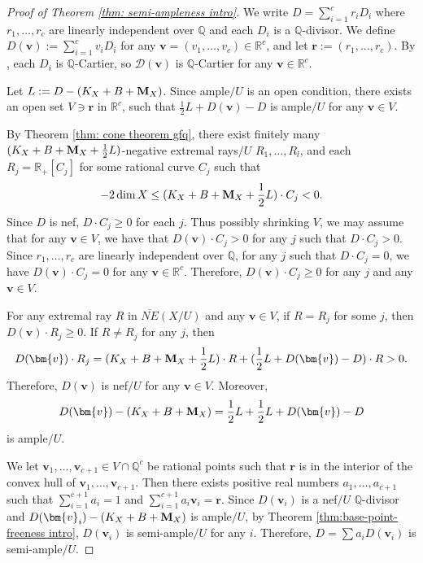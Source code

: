 \documentclass[11pt]{amsart}
\numberwithin{equation}{section}
\newcommand{\Mm}{{\bf{M}}}
\newcommand{\Qq}{\mathbb{Q}}
\theoremstyle{definition}
\theoremstyle{definition}
\theoremstyle{definition}
\begin{document}
\begin{proof}[Proof of Theorem \ref{thm: semi-ampleness intro}]
We write $D=\sum_{i=1}^c r_iD_i$ where $r_1,\dots,r_c$ are linearly independent over $\mathbb Q$ and each $D_i$ is a $\Qq$-divisor. We define $D(\bm{v}):=\sum_{i=1}^cv_iD_i$ for any $\bm{v}=(v_1,\dots,v_c)\in\mathbb R^c$, and let $\bm{r}:=(r_1,\dots,r_c)$. By \cite[Lemma 5.3]{HLS19}, each $D_i$ is $\Qq$-Cartier, so $\mathcal{D}(\bm{v})$ is $\Qq$-Cartier for any $\bm{v}\in\mathbb R^c$. 

Let $L:=D-(K_X+B+\Mm_X)$. Since ample$/U$ is an open condition, there exists an open set $V\ni\bm{r}$ in $\mathbb R^c$, such that 
$\frac{1}{2}L+D(\bm{v})-D$ is ample$/U$ for any $\bm{v}\in V$.

By Theorem \ref{thm: cone theorem gfq}, there exist finitely many $(K_X+B+\Mm_X+\frac{1}{2}L)$-negative extremal rays$/U$ $R_1,\dots,R_l$, and each $R_j=\mathbb R_+[C_j]$ for some rational curve $C_j$ such that
$$-2\dim X\leq (K_X+B+\Mm_X+\frac{1}{2}L)\cdot C_j<0.$$
Since $D$ is nef, $D\cdot C_j\geq 0$ for each $j$. Thus possibly shrinking $V$, we may assume that for any $\bm{v}\in V$, we have that $D(\bm{v})\cdot C_j>0$ for any $j$ such that $D\cdot C_j>0$. Since $r_1,\dots,r_c$ are linearly independent over $\mathbb Q$, for any $j$ such that $D\cdot C_j=0$, we have $D(\bm{v})\cdot C_j=0$ for any $\bm{v}\in\mathbb R^c$. Therefore,  $D(\bm{v})\cdot C_j\geq 0$ for any $j$ and any $\bm{v}\in V$.

For any extremal ray $R$ in $\overline{NE}(X/U)$ and any $\bm{v}\in V$, if $R=R_j$ for some $j$, then $D(\bm{v})\cdot R_j\geq 0$. If $R\not=R_j$ for any $j$, then
$$D(\bm{v})\cdot R_j=(K_X+B+\Mm_X+\frac{1}{2}L)\cdot R+(\frac{1}{2}L+D(\bm{v})-D)\cdot R>0.$$
Therefore, $D(\bm{v})$ is nef$/U$ for any $\bm{v}\in V$. Moreover,
$$D(\bm{v})-(K_X+B+\Mm_X)=\frac{1}{2}L+\frac{1}{2}L+D(\bm{v})-D$$
is ample$/U$.

We let $\bm{v}_1,\dots,\bm{v}_{c+1}\in V\cap\mathbb Q^c$ be rational points such that $\bm{r}$ is in the interior of the convex hull of $\bm{v}_1,\dots,\bm{v}_{c+1}$. Then there exists positive real numbers $a_1,\dots,a_{c+1}$ such that $\sum_{i=1}^{c+1}a_i=1$ and $\sum_{i=1}^{c+1}a_i\bm{v}_i=\bm{r}$. Since $D(\bm{v}_i)$ is a nef$/U$ $\Qq$-divisor and $D(\bm{v}_i)-(K_X+B+\Mm_X)$ is ample$/U$, by Theorem \ref{thm:base-point-freeness intro}, $D(\bm{v}_i)$ is semi-ample$/U$ for any $i$. Therefore, $D=\sum a_iD(\bm{v}_i)$ is semi-ample$/U$.
\end{proof}
\end{document}
